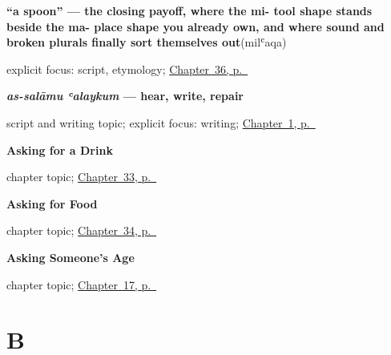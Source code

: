 \noindent\begin{minipage}[t]{\linewidth}
\raggedright
\textbf{\textquotedblleft{}a spoon\textquotedblright{} — the closing payoff, where the mi- tool shape stands beside the ma- place shape you already own, and where sound and broken plurals finally sort themselves out}\enspace\emph{}\enspace(milʿaqa)\par
\footnotesize explicit focus: script, etymology; \hyperref[ch:ar-cups-plates-and-more-than-one]{Chapter~36, p.~\pageref*{ch:ar-cups-plates-and-more-than-one}}
\end{minipage}\par\smallskip

\noindent\begin{minipage}[t]{\linewidth}
\raggedright
\textbf{\emph{as-salāmu ʿalaykum} — hear, write, repair}\par
\footnotesize script and writing topic; explicit focus: writing; \hyperref[ch:greetings]{Chapter~1, p.~\pageref*{ch:greetings}}
\end{minipage}\par\smallskip

\noindent\begin{minipage}[t]{\linewidth}
\raggedright
\textbf{Asking for a Drink}\par
\footnotesize chapter topic; \hyperref[ch:ar-asking-for-a-drink]{Chapter~33, p.~\pageref*{ch:ar-asking-for-a-drink}}
\end{minipage}\par\smallskip

\noindent\begin{minipage}[t]{\linewidth}
\raggedright
\textbf{Asking for Food}\par
\footnotesize chapter topic; \hyperref[ch:ar-asking-for-food]{Chapter~34, p.~\pageref*{ch:ar-asking-for-food}}
\end{minipage}\par\smallskip

\noindent\begin{minipage}[t]{\linewidth}
\raggedright
\textbf{Asking Someone's Age}\par
\footnotesize chapter topic; \hyperref[ch:ar-asking-age]{Chapter~17, p.~\pageref*{ch:ar-asking-age}}
\end{minipage}\par\smallskip

\section*{B}

